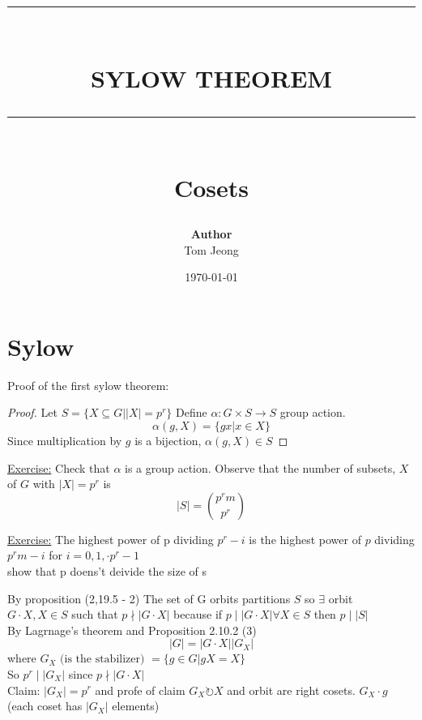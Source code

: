 \documentclass{article}
\newcommand{\HRule}[1]{\rule{\linewidth}{#1}}
\begin{document}

\title{ \normalsize \textsc{}
		\\ [2.0cm]
		\HRule{1.5pt} \\
		\LARGE \textbf{\uppercase{Sylow Theorem}}
		\HRule{2.0pt} \\ [0.6cm] \LARGE{Cosets}
		}

\date{\today}
\author{\textbf{Author} \\ 
		Tom Jeong
        }

\maketitle
\newpage

\tableofcontents
\newpage

\section{Sylow}
Proof of the first sylow theorem: 

\begin{proof}
    Let $S = \{X \subseteq G | |X| = p^r\}$
    Define $\alpha: G \times S \to S $ group action. 
   $$\alpha(g,X) = \{gx | x \in X\}$$
    Since multiplication by $g$ is a bijection, $\alpha(g, X) \in S$  
\end{proof}
\underline{Exercise:} Check that $\alpha$ is a group action. 
Observe that the number of subsets, $X$ of $G$ with $|X| = p^r$ is $$|S| = \binom{p^rm}{p^r }$$


\underline{Exercise:} The highest power of p dividing $p^r - i$ is the highest power of $p$ dividing $p^rm -i$ for $i = 0,1, \cdot p^r -1$ \\ 
show that p doens't deivide the size of s



 
By proposition (2,19.5 - 2) The set of G orbits partitions $S$ so $\exists$ orbit $G \cdot X, X \in S$ such that $p \nmid |G \cdot X|$ because if $p \mid |G\cdot X| \forall X \in S$ then $p\mid |S|$ \\ 
By Lagrnage's theorem and Proposition 2.10.2 (3) $$|G| = |G \cdot X | |G_X| $$ where $G_X \text{ (is the stabilizer) } = \{g \in G | gX = X\}$
\\ So $p^r \mid |G_X| $ since $p \nmid |G \cdot X|$ \\ 
Claim: $|G_X| = p^r$ and profe of claim $G_X \circlearrowright X$ and orbit are right cosets. $G_X \cdot g$ (each coset has $|G_X|$ elements)
\end{document}

